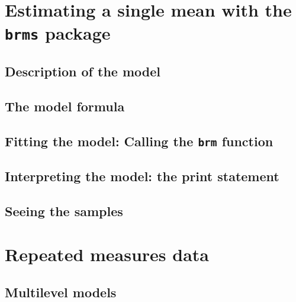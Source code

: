 \documentclass[
]{book}
\begin{document}
\hypertarget{estimating-a-single-mean-with-the-brms-package}{%
\section{\texorpdfstring{Estimating a single mean with the \texttt{brms} package}{Estimating a single mean with the brms package}}\label{estimating-a-single-mean-with-the-brms-package}}

\hypertarget{description-of-the-model}{%
\subsection{Description of the model}\label{description-of-the-model}}

\hypertarget{the-model-formula}{%
\subsection{The model formula}\label{the-model-formula}}

\hypertarget{fitting-the-model-calling-the-brm-function}{%
\subsection{\texorpdfstring{Fitting the model: Calling the \texttt{brm} function}{Fitting the model: Calling the brm function}}\label{fitting-the-model-calling-the-brm-function}}

\hypertarget{interpreting-the-model-the-print-statement}{%
\subsection{Interpreting the model: the print statement}\label{interpreting-the-model-the-print-statement}}

\hypertarget{seeing-the-samples}{%
\subsection{Seeing the samples}\label{seeing-the-samples}}

\hypertarget{repeated-measures-data}{%
\section{Repeated measures data}\label{repeated-measures-data}}

\hypertarget{multilevel-models}{%
\subsection{Multilevel models}\label{multilevel-models}}
\end{document}

